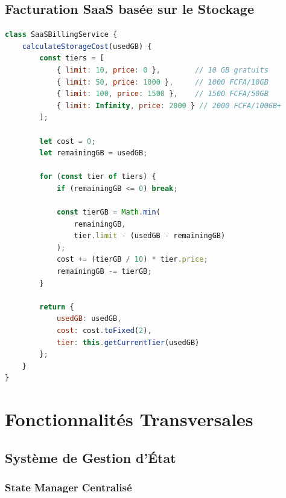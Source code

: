 \documentclass[12pt,a4paper]{article}
\begin{document}
\subsection{Facturation SaaS basée sur le Stockage}

\begin{lstlisting}[language=JavaScript,caption=Facturation stockage]
class SaaSBillingService {
    calculateStorageCost(usedGB) {
        const tiers = [
            { limit: 10, price: 0 },        // 10 GB gratuits
            { limit: 50, price: 1000 },     // 1000 FCFA/10GB
            { limit: 100, price: 1500 },    // 1500 FCFA/50GB
            { limit: Infinity, price: 2000 } // 2000 FCFA/100GB+
        ];
        
        let cost = 0;
        let remainingGB = usedGB;
        
        for (const tier of tiers) {
            if (remainingGB <= 0) break;
            
            const tierGB = Math.min(
                remainingGB, 
                tier.limit - (usedGB - remainingGB)
            );
            cost += (tierGB / 10) * tier.price;
            remainingGB -= tierGB;
        }
        
        return {
            usedGB: usedGB,
            cost: cost.toFixed(2),
            tier: this.getCurrentTier(usedGB)
        };
    }
}
\end{lstlisting}

\section{Fonctionnalités Transversales}

\subsection{Système de Gestion d'État}

\subsubsection{State Manager Centralisé}
\end{document}
